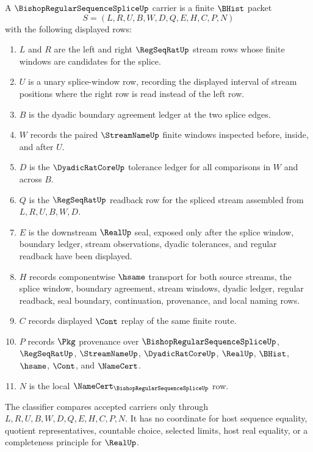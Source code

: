 \begin{definition}
\label{def:bishop-regular-sequence-splice-carrier}
A $\BishopRegularSequenceSpliceUp$ carrier is a finite $\BHist$ packet
$$
S=(L,R,U,B,W,D,Q,E,H,C,P,N)
$$
with the following displayed rows:
\begin{enumerate}
\item $L$ and $R$ are the left and right $\RegSeqRatUp$ stream rows whose finite windows are candidates for the splice.
\item $U$ is a unary splice-window row, recording the displayed interval of stream positions where the right row is read instead of the left row.
\item $B$ is the dyadic boundary agreement ledger at the two splice edges.
\item $W$ records the paired $\StreamNameUp$ finite windows inspected before, inside, and after $U$.
\item $D$ is the $\DyadicRatCoreUp$ tolerance ledger for all comparisons in $W$ and across $B$.
\item $Q$ is the $\RegSeqRatUp$ readback row for the spliced stream assembled from $L,R,U,B,W,D$.
\item $E$ is the downstream $\RealUp$ seal, exposed only after the splice window, boundary ledger, stream observations, dyadic tolerances, and regular readback have been displayed.
\item $H$ records componentwise $\hsame$ transport for both source streams, the splice window, boundary agreement, stream windows, dyadic ledger, regular readback, seal boundary, continuation, provenance, and local naming rows.
\item $C$ records displayed $\Cont$ replay of the same finite route.
\item $P$ records $\Pkg$ provenance over $\BishopRegularSequenceSpliceUp$, $\RegSeqRatUp$, $\StreamNameUp$, $\DyadicRatCoreUp$, $\RealUp$, $\BHist$, $\hsame$, $\Cont$, and $\NameCert$.
\item $N$ is the local $\NameCert_{\BishopRegularSequenceSpliceUp}$ row.
\end{enumerate}
The classifier compares accepted carriers only through $L,R,U,B,W,D,Q,E,H,C,P,N$. It has no coordinate for host sequence equality, quotient representatives, countable choice, selected limits, host real equality, or a completeness principle for $\RealUp$.
\end{definition}

